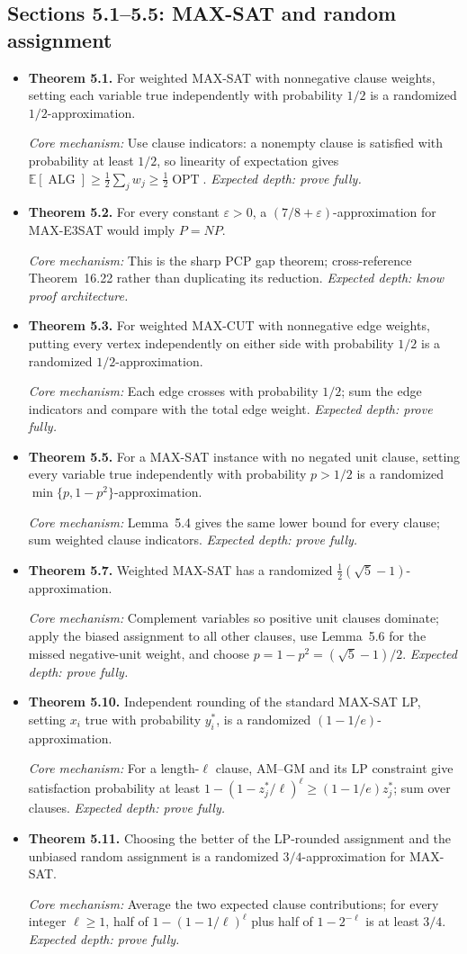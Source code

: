 \documentclass[11pt,a4paper]{article}
\newcommand{\OPT}{\operatorname{OPT}}
\newcommand{\ALG}{\operatorname{ALG}}
\newcommand{\E}{\mathbb E}
\newcommand{\1}{\mathbf 1}
\newcommand{\catalogue}[4]{%
  \item \textbf{#1.} #2\par
  {\footnotesize\emph{Core mechanism:} #3
  \emph{Expected depth: #4.}}}
\begin{document}
\subsection*{Sections 5.1--5.5: MAX-SAT and random assignment}
\begin{itemize}
\catalogue{Theorem 5.1}{For weighted MAX-SAT with nonnegative clause weights,
setting each variable true independently with probability $1/2$ is a randomized
$1/2$-approximation.}{Use clause indicators: a nonempty clause is satisfied with
probability at least $1/2$, so linearity of expectation gives
$\E[\ALG]\geq\tfrac12\sum_jw_j\geq\tfrac12\OPT$.}{prove fully}

\catalogue{Theorem 5.2}{For every constant $\varepsilon>0$, a
$(7/8+\varepsilon)$-approximation for MAX-E3SAT would imply $P=NP$.}{This is
the sharp PCP gap theorem; cross-reference Theorem~16.22 rather than duplicating
its reduction.}{know proof architecture}

\catalogue{Theorem 5.3}{For weighted MAX-CUT with nonnegative edge weights,
putting every vertex independently on either side with probability $1/2$ is a
randomized $1/2$-approximation.}{Each edge crosses with probability $1/2$;
sum the edge indicators and compare with the total edge weight.}{prove fully}

\catalogue{Theorem 5.5}{For a MAX-SAT instance with no negated unit clause,
setting every variable true independently with probability $p>1/2$ is a
randomized $\min\{p,1-p^2\}$-approximation.}{Lemma~5.4 gives the same lower
bound for every clause; sum weighted clause indicators.}{prove fully}

\catalogue{Theorem 5.7}{Weighted MAX-SAT has a randomized
$\frac12(\sqrt5-1)$-approximation.}{Complement variables so positive unit
clauses dominate; apply the biased assignment to all other clauses, use
Lemma~5.6 for the missed negative-unit weight, and choose
$p=1-p^2=(\sqrt5-1)/2$.}{prove fully}

\catalogue{Theorem 5.10}{Independent rounding of the standard MAX-SAT LP,
setting $x_i$ true with probability $y_i^*$, is a randomized
$(1-1/e)$-approximation.}{For a length-$\ell$ clause, AM--GM and its LP
constraint give satisfaction probability at least
$1-(1-z_j^*/\ell)^\ell\geq(1-1/e)z_j^*$; sum over clauses.}{prove fully}

\catalogue{Theorem 5.11}{Choosing the better of the LP-rounded assignment and
the unbiased random assignment is a randomized $3/4$-approximation for
MAX-SAT.}{Average the two expected clause contributions; for every integer
$\ell\geq1$, half of $1-(1-1/\ell)^\ell$ plus half of $1-2^{-\ell}$ is at
least $3/4$.}{prove fully}




























\end{itemize}
\end{document}
